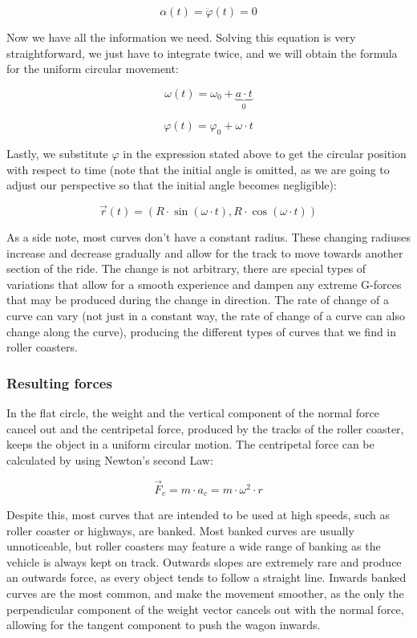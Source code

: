 \documentclass[12pt,twoside,a4paper]{article}
\renewcommand{\phi}{\varphi}
\begin{document}
	$$\alpha(t) = \ddot\phi(t) = 0$$
	
	Now we have all the information we need. Solving this equation is very straightforward, we just have to integrate twice, and we will obtain the formula for the uniform circular movement:
	
	$$\omega(t) = \omega_0 + \underset{0}{\underbrace{a \cdot t}}$$
	
	$$\phi(t) = \phi_0 + \omega \cdot t$$
	
	Lastly, we substitute $\phi$ in the expression stated above to get the circular position with respect to time (note that the initial angle is omitted, as we are going to adjust our perspective so that the initial angle becomes negligible):
	
	$$\boxed{\vec{r}(t) = (R \cdot \sin{(\omega \cdot t)}, R \cdot \cos{(\omega \cdot t)})}$$
	
	As a side note, most curves don't have a constant radius. These changing radiuses increase and decrease gradually and allow for the track to move towards another section of the ride. The change is not arbitrary, there are special types of variations that allow for a smooth experience and dampen any extreme G-forces that may be produced during the change in direction. The rate of change of a curve can vary (not just in a constant way, the rate of change of a curve can also change along the curve), producing the different types of curves that we find in roller coasters.
		
	\subsubsection{Resulting forces}
	In the flat circle, the weight and the vertical component of the normal force cancel out and the centripetal force, produced by the tracks of the roller coaster, keeps the object in a uniform circular motion. The centripetal force can be calculated by using Newton's second Law:
	
	$$\vec{F}_c = m \cdot a_c = m \cdot \omega^2 \cdot r$$
	
	Despite this, most curves that are intended to be used at high speeds, such as roller coaster or highways, are banked. Most banked curves are usually unnoticeable, but roller coasters may feature a wide range of banking as the vehicle is always kept on track. Outwards slopes are extremely rare and produce an outwards force, as every object tends to follow a straight line. Inwards banked curves are the most common, and make the movement smoother, as the only the perpendicular component of the weight vector cancels out with the normal force, allowing for the tangent component to push the wagon inwards.
	
\end{document}
